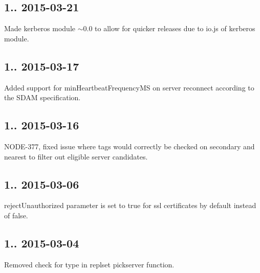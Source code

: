 \subsection*{1.. 2015-\/03-\/21 }


\begin{DoxyItemize}
\item Made kerberos module $\sim$0.0 to allow for quicker releases due to io.\+js of kerberos module.
\end{DoxyItemize}

\subsection*{1.. 2015-\/03-\/17 }


\begin{DoxyItemize}
\item Added support for min\+Heartbeat\+Frequency\+MS on server reconnect according to the S\+D\+AM specification.
\end{DoxyItemize}

\subsection*{1.. 2015-\/03-\/16 }


\begin{DoxyItemize}
\item N\+O\+D\+E-\/377, fixed issue where tags would correctly be checked on secondary and nearest to filter out eligible server candidates.
\end{DoxyItemize}

\subsection*{1.. 2015-\/03-\/06 }


\begin{DoxyItemize}
\item reject\+Unauthorized parameter is set to true for ssl certificates by default instead of false.
\end{DoxyItemize}

\subsection*{1.. 2015-\/03-\/04 }


\begin{DoxyItemize}
\item Removed check for type in replset pickserver function.
\end{DoxyItemize}

